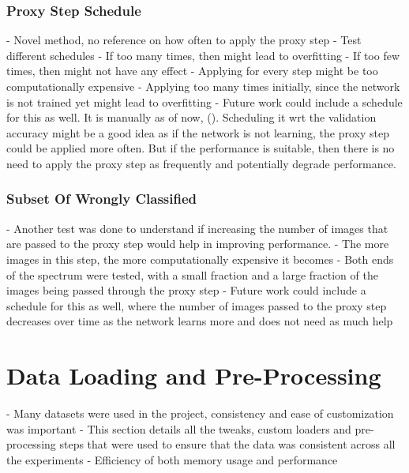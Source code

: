 
\subsubsection{Proxy Step Schedule}
- Novel method, no reference on how often to apply the proxy step
- Test different schedules
- If too many times, then might lead to overfitting
- If too few times, then might not have any effect
- Applying for every step might be too computationally expensive
- Applying too many times initially, since the network is not trained yet might lead to overfitting
- Future work could include a schedule for this as well. It is manually as of now, (). Scheduling it wrt the validation accuracy might be a good idea as if the network is not learning, the proxy step could be applied more often. But if the performance is suitable, then there is no need to apply the proxy step as frequently and potentially degrade performance.

\subsubsection{Subset Of Wrongly Classified}
- Another test was done to understand if increasing the number of images that are passed to the proxy step would help in improving performance.
- The more images in this step, the more computationally expensive it becomes
- Both ends of the spectrum were tested, with a small fraction and a large fraction of the images being passed through the proxy step
- Future work could include a schedule for this as well, where the number of images passed to the proxy step decreases over time as the network learns more and does not need as much help

\section{Data Loading and Pre-Processing}
- Many datasets were used in the project, consistency and ease of customization was important
- This section details all the tweaks, custom loaders and pre-processing steps that were used to ensure that the data was consistent across all the experiments
- Efficiency of both memory usage and performance

